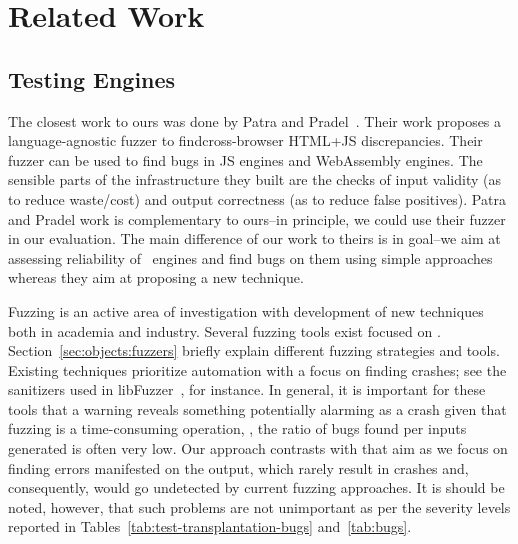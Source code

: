 \documentclass[10pt,conference,anonymous]{IEEEtran}
\begin{document}


\section{Related Work}

\subsection{Testing \js{} Engines}
\label{sec:testing-js-engines}
The closest work to ours was done by Patra and
Pradel~\cite{patra2016learning}. Their work proposes a
language-agnostic fuzzer to findcross-browser HTML+JS
discrepancies. Their fuzzer can be used to find bugs in JS engines and
WebAssembly engines. The sensible parts of the infrastructure they
built are the checks of input validity (as to reduce waste/cost) and
output correctness (as to reduce false positives). Patra and Pradel
work is complementary to ours--in principle, we could use their fuzzer
in our evaluation. The main difference of our work to theirs is in
goal--we aim at assessing reliability of \js\ engines and find bugs on
them using simple approaches whereas they aim at proposing a new
technique.

Fuzzing is an active area of investigation with development of new
techniques both in academia and industry. Several fuzzing tools exist
focused on \js. Section~\ref{sec:objects:fuzzers} briefly explain
different fuzzing strategies and tools. Existing techniques prioritize
automation with a focus on finding crashes; see the sanitizers used in
libFuzzer~\cite{libfuzzer-tutorial}, for instance. In general, it is
important for these tools that a warning reveals something potentially
alarming as a crash given that fuzzing is a time-consuming operation,
\ie{}, the ratio of bugs found per inputs generated is often very low.
Our approach contrasts with that aim as we focus on finding errors
manifested on the output, which rarely result in crashes and,
consequently, would go undetected by current fuzzing approaches. It is
should be noted, however, that such problems are not unimportant as
per the severity levels reported in
Tables~\ref{tab:test-transplantation-bugs} and~\ref{tab:bugs}.
\end{document}
